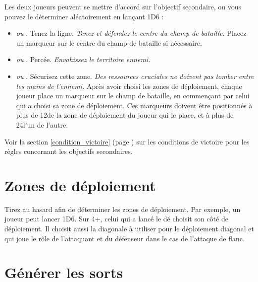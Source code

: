 Les deux joueurs peuvent se mettre d'accord sur l'objectif secondaire, ou vous pouvez le déterminer aléatoirement en lançant 1D6 : 
\begin{itemize}[label={-}]
\item \emph{ ou }. Tenez la ligne. \emph{Tenez et défendez le centre du champ de bataille.} Placez un marqueur sur le centre du champ de bataille si nécessaire.
\item \emph{ ou }. Percée. \emph{Envahissez le territoire ennemi.}
\item \emph{ ou }. Sécurisez cette zone. \emph{Des ressources cruciales ne doivent pas tomber entre les mains de l'ennemi.} Après avoir choisi les zones de déploiement, chaque joueur place un marqueur sur le champ de bataille, en commençant par celui qui a choisi sa zone de déploiement. Ces marqueurs doivent être positionnés à plus de \unit{12}\pouce de la zone de déploiement du joueur qui le place, et à plus de \unit{24}\pouce l’un de l’autre.
\end{itemize}

Voir la section \ref{condition_victoire} (page \pageref{condition_victoire}) sur les conditions de victoire pour les règles concernant les objectifs secondaires.

\section{Zones de déploiement}

Tirez au hasard afin de déterminer les zones de déploiement. Par exemple, un joueur peut lancer 1D6. Sur 4+, celui qui a lancé le dé choisit son côté de déploiement. Il choisit aussi la diagonale à utiliser pour le déploiement diagonal et qui joue le rôle de l'attaquant et du défenseur dans le cas de l'attaque de flanc.

\section{Générer les sorts}
\label{generation_sorts}

